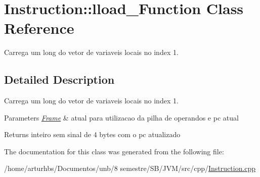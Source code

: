 \hypertarget{classInstruction_1_1lload__1Function}{}\section{Instruction\+:\+:lload\+\_\+Function Class Reference}
\label{classInstruction_1_1lload__1Function}


Carrega um long do vetor de variaveis locais no index 1.  




\subsection{Detailed Description}
Carrega um long do vetor de variaveis locais no index 1. 


\begin{DoxyParams}{Parameters}
{\em \hyperlink{classFrame}{Frame}} & atual para utilizacao da pilha de operandos e pc atual \\
\hline
\end{DoxyParams}
\begin{DoxyReturn}{Returns}
inteiro sem sinal de 4 bytes com o pc atualizado 
\end{DoxyReturn}


The documentation for this class was generated from the following file\+:\begin{DoxyCompactItemize}
\item 
/home/arturhbs/\+Documentos/unb/8 semestre/\+S\+B/\+J\+V\+M/src/cpp/\hyperlink{Instruction_8cpp}{Instruction.\+cpp}\end{DoxyCompactItemize}
